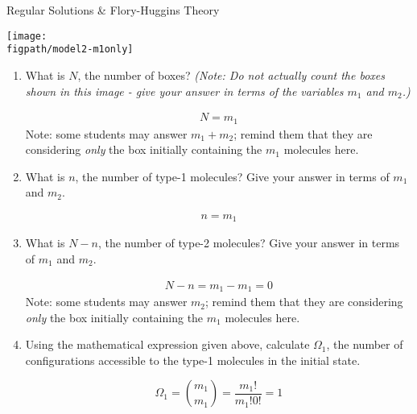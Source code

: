 \begin{activity}{Regular Solutions \& Flory-Huggins Theory}
\begin{ctqs}
	\vspace{6pt}
	\centerline{\texttt{[image: \\figpath/model2-m1only]}}
	\vspace{-10pt}
	
			\begin{enumerate}
				\item What is $N$, the number of boxes?	\emph{(Note: Do not actually count the boxes shown in this image - give your answer in terms of the variables $m_1$ and $m_2$.)}
				
					\begin{solution}[0.6in]
						\vspace{-20pt}
						\begin{align*}
							N = m_1
						\end{align*}
						Note: some students may answer $m_1+m_2$; remind them that they are considering \emph{only} the box initially containing the $m_1$ molecules here.
					\end{solution}
				
				\item What is $n$, the number of type-1 molecules?  Give your answer in terms of $m_1$ and $m_2$.
				
					\begin{solution}[0.6in]
						\begin{align*}
							n = m_1
						\end{align*}
					\end{solution}
				
				\item What is $N-n$, the number of type-2 molecules? Give your answer in terms of $m_1$ and $m_2$.
				
					\begin{solution}[0.5in]
						\vspace{-20pt}
						\begin{align*}
							N-n = m_1 - m_1 = 0
						\end{align*}
						Note: some students may answer $m_2$; remind them that they are considering \emph{only} the box initially containing the $m_1$ molecules here.
					\end{solution}
					
				\item Using the mathematical expression given above, calculate $\Omega_1$, the number of configurations accessible to the type-1 molecules in the initial state.
				
					\begin{solution}[1.5in]
						\begin{equation*}
							\Omega_1 = {m_1 \choose m_1} = \frac{m_1!}{m_1! 0!} = 1
						\end{equation*}
					\end{solution}
				

\end{enumerate}
\end{ctqs}
\end{activity}
